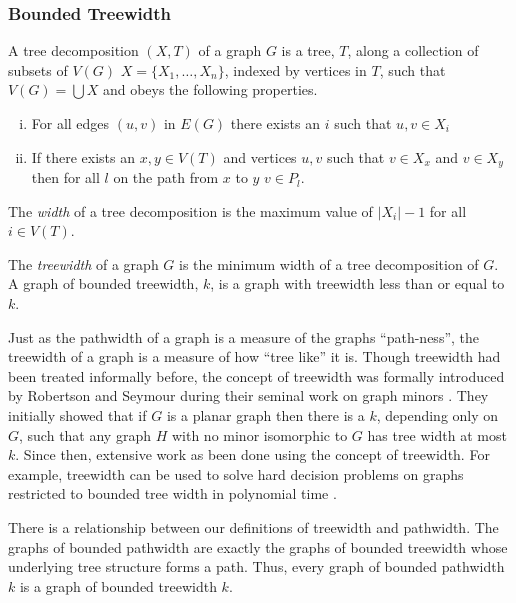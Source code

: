 \subsubsection{Bounded Treewidth}

\begin{definition}
    A tree decomposition $(X,T)$ of a graph $G$ is a tree, $T$, along a collection of subsets of $V(G)$ $X=\{X_1,\dots,X_n\}$, indexed by vertices in $T$, such that $V(G)=\bigcup X$ and obeys the following properties.    
    \begin{enumerate}[(i)]
        \item For all edges $(u,v)$ in $E(G)$ there exists an $i$ such that $u,v\in X_i$
        \item  If there exists an $x,y\in V(T)$ and vertices $u,v$ such that $v\in X_x$ and $v\in X_y$ then for all $l$ on the path from $x$ to $y$ $v\in P_l$.
    \end{enumerate} 
    The \textit{width} of a tree decomposition is the maximum value of $|X_i| -1$ for all $i\in V(T)$.
\end{definition}

\begin{definition}[Treewidth]
    The \textit{treewidth} of a graph $G$ is the minimum width of a tree decomposition of $G$.    
    A graph of bounded treewidth, $k$, is a graph with treewidth less than or equal to $k$. 
\end{definition}

Just as the pathwidth of a graph is a measure of the graphs ``path-ness'', the treewidth of a graph is a measure of how ``tree like'' it is. Though treewidth had been treated informally before, the concept of treewidth was formally introduced by Robertson and Seymour during their seminal work on graph minors \cite{robertson1986graphV}. They initially showed that if $G$ is a planar graph then there is a $k$, depending only on $G$, such that any graph $H$ with no minor isomorphic to $G$ has tree width at most $k$.  Since then, extensive work as been done using the concept of treewidth. For example, treewidth can be used to solve hard decision problems on graphs restricted to bounded tree width in polynomial time \cite{bodlaender1988dynamic}.

There is a relationship between our definitions of treewidth and pathwidth. The graphs of bounded pathwidth are exactly the graphs of bounded treewidth whose underlying tree structure forms a path. Thus, every graph of bounded pathwidth $k$ is a graph of bounded treewidth $k$. 

